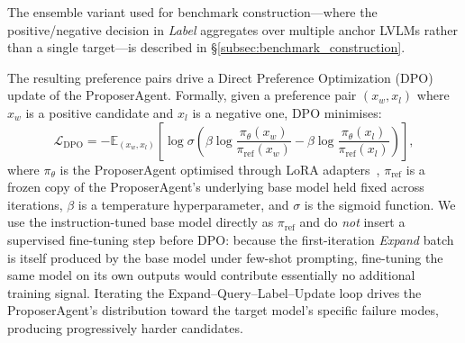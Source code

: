 \documentclass[lettersize,journal]{IEEEtran}
\begin{document}
The ensemble variant used for benchmark construction---where the positive/negative decision in \emph{Label} aggregates over multiple anchor LVLMs rather than a single target---is described in \S\ref{subsec:benchmark_construction}.

The resulting preference pairs drive a Direct Preference Optimization (DPO)~\cite{rafailov2023direct} update of the ProposerAgent.
Formally, given a preference pair $(x_w, x_l)$ where $x_w$ is a positive candidate and $x_l$ is a negative one, DPO minimises:
\begin{equation}
\label{eq:dpo}
\mathcal{L}_{\text{DPO}} = -\mathbb{E}_{(x_w, x_l)} \left[ \log \sigma \left( \beta \log \frac{\pi_\theta(x_w)}{\pi_{\text{ref}}(x_w)} - \beta \log \frac{\pi_\theta(x_l)}{\pi_{\text{ref}}(x_l)} \right) \right],
\end{equation}
where $\pi_\theta$ is the ProposerAgent optimised through LoRA adapters~\cite{hu2022lora}, $\pi_{\text{ref}}$ is a frozen copy of the ProposerAgent's underlying base model held fixed across iterations, $\beta$ is a temperature hyperparameter, and $\sigma$ is the sigmoid function.
We use the instruction-tuned base model directly as $\pi_{\text{ref}}$ and do \emph{not} insert a supervised fine-tuning step before DPO: because the first-iteration \emph{Expand} batch is itself produced by the base model under few-shot prompting, fine-tuning the same model on its own outputs would contribute essentially no additional training signal.
Iterating the Expand--Query--Label--Update loop drives the ProposerAgent's distribution toward the target model's specific failure modes, producing progressively harder candidates.
\end{document}
